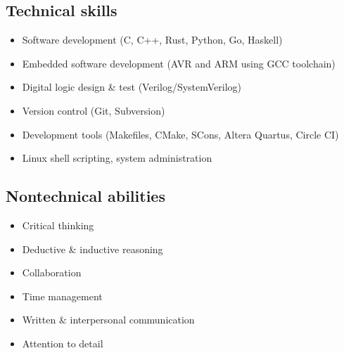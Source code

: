 
\vspace{-1.2em}

\begin{multicols}{2}
  \subsection*{Technical skills}

  \begin{itemize}
    \item Software development (C, C++, Rust, Python, Go, Haskell)
    \item Embedded software development (AVR and ARM using GCC toolchain)
    \item Digital logic design \& test (Verilog/SystemVerilog)
    \item Version control (Git, Subversion)
    \item Development tools (Makefiles, CMake, SCons, Altera Quartus, Circle CI)
    \item Linux shell scripting, system administration
  \end{itemize}

  \vfill\null
  \columnbreak

  \subsection*{Nontechnical abilities}

  \begin{itemize}
    \item Critical thinking
    \item Deductive \& inductive reasoning
    \item Collaboration
    \item Time management
    \item Written \& interpersonal communication
    \item Attention to detail
  \end{itemize}

  \vfill\null
\end{multicols}
